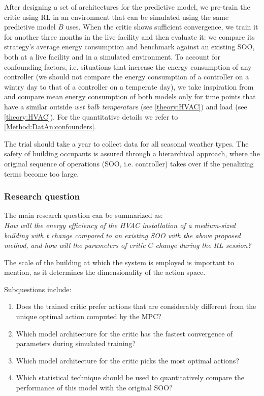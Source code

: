 \documentclass{article}
\theoremstyle{definition}
\theoremstyle{remark}
\begin{document}
After designing a set of architectures for the predictive model, we pre-train the critic using RL in an environment that can be simulated using the same predictive model $B$ uses. When the critic shows sufficient convergence, we train it for another three months in the live facility and then evaluate it: we  compare its strategy's average energy consumption and benchmark against an existing SOO, both at a live facility and in a simulated environment. To account for confounding factors, i.e. situations that increase the energy consumption of any controller (we should not compare the energy consumption of a controller on a wintry day to that of a controller on a temperate day), we take inspiration from \cite{luo2022controlling} and compare mean energy consumption of both models only for time points that have a similar outside \textit{wet bulb temperature} (see \ref{theory:HVAC}) and load (see \ref{theory:HVAC}). For the quantitative details we refer to \ref{Method:DatAn:confounders}. 

The trial should take a year to collect data for all seasonal weather types. The safety of building occupants is assured through a hierarchical approach, where the original sequence of operations (SOO, i.e. controller) takes over if the penalizing terms become too large.




\FloatBarrier


\subsubsection{Research question}

The main research question can be summarized as: \\
\textit{How will the energy efficiency of the HVAC installation of a medium-sized building with t change compared to an existing SOO with the above proposed method, and how will the parameters of critic $C$ change during the RL session? }

The scale of the building at which the system is employed is important to mention, as it determines the dimensionality of the action space.

Subquestions include:
\begin{enumerate}
    \item Does the trained critic prefer actions that are considerably different from the unique optimal action computed by the MPC?
    \item Which model architecture for the critic has the fastest convergence of parameters during simulated training?
    \item Which model architecture for the critic picks the most optimal actions?
    \item Which statistical technique should be used to quantitatively compare the performance of this model with the original SOO?
\end{enumerate}
\end{document}
